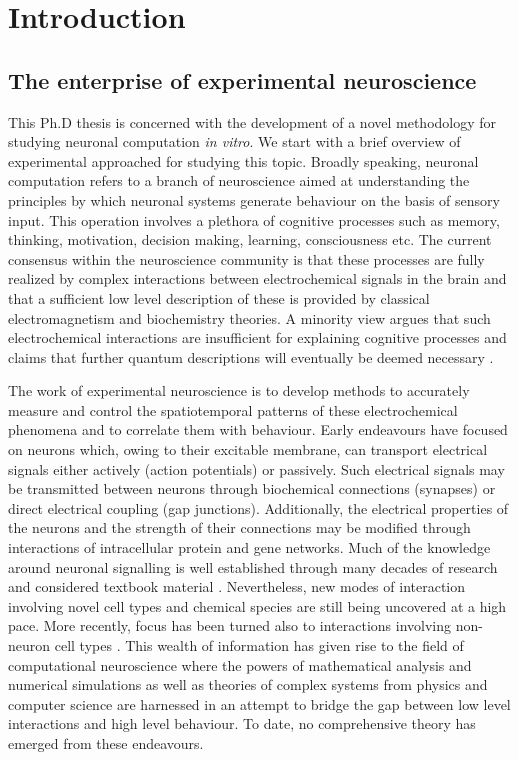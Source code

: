 \chapter{Introduction}
\label{chap:introduction}

    \section{The enterprise of experimental neuroscience}
    \label{sec:introduction:neuroExp}
    This Ph.D thesis is concerned with the development of a novel methodology for studying neuronal computation \textit{in vitro}. We start with a brief overview of experimental approached for studying this topic. Broadly speaking, neuronal computation refers to a branch of neuroscience aimed at understanding the principles by which neuronal systems generate behaviour on the basis of sensory input. This operation involves a plethora of cognitive processes such as memory, thinking, motivation, decision making, learning, consciousness etc. The current consensus within the neuroscience community is that these processes are fully realized by complex interactions between electrochemical signals in the brain and that a sufficient low level description of these is provided by classical electromagnetism and biochemistry theories. A minority view argues that such electrochemical interactions are insufficient for explaining cognitive processes and claims that further quantum descriptions will eventually be deemed necessary \cite{hameroff2014consciousness,hagan2002quantum}.

    The work of experimental neuroscience is to develop methods to accurately measure and control the spatiotemporal patterns of these electrochemical phenomena and to correlate them with behaviour. Early endeavours have focused on neurons which, owing to their excitable membrane, can transport electrical signals either actively (action potentials) or passively. Such electrical signals may be transmitted between neurons through biochemical connections (synapses) or direct electrical coupling (gap junctions). Additionally, the electrical properties of the neurons and the strength of their connections may be modified through interactions of intracellular protein and gene networks. Much of the knowledge around neuronal signalling is well established through many decades of research and considered textbook material \cite{Kandel}. Nevertheless, new modes of interaction involving novel cell types and chemical species are still being uncovered at a high pace. More recently, focus has been turned also to interactions involving non-neuron cell types \cite{volterra2005astrocytes,olah2009regulation}. This wealth of information has given rise to the field of computational neuroscience where the powers of mathematical analysis and numerical simulations as well as theories of complex systems from physics and computer science are harnessed in an attempt to bridge the gap between low level interactions and high level behaviour. To date, no comprehensive theory has emerged from these endeavours.

